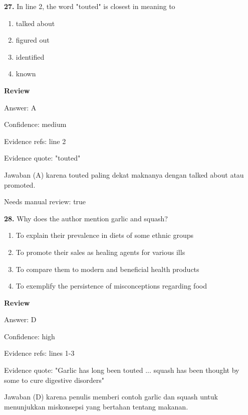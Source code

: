 \documentclass[12pt]{article}
\begin{document}
\par
\vspace{0.25\baselineskip}
\noindent\textbf{27.} In line 2, the word "touted" is closest in meaning to
\begin{enumerate}[label=(\Alph*),leftmargin=*,itemsep=0.2em]
\item talked about
\item figured out
\item identified
\item known
\end{enumerate}
\par
\begingroup
\setlength{\parskip}{0pt}
\setlength{\parindent}{0pt}
\textbf{Review}\par
Answer: A\par
Confidence: medium\par
Evidence refs: line 2\par
Evidence quote: "touted"\par
Jawaban (A) karena touted paling dekat maknanya dengan talked about atau promoted.\par
Needs manual review: true\par
\endgroup
\par
\vspace{0.25\baselineskip}
\noindent\textbf{28.} Why does the author mention garlic and squash?
\begin{enumerate}[label=(\Alph*),leftmargin=*,itemsep=0.2em]
\item To explain their prevalence in diets of some ethnic groups
\item To promote their sales as healing agents for various ills
\item To compare them to modern and beneficial health products
\item To exemplify the persistence of misconceptions regarding food
\end{enumerate}
\par
\begingroup
\setlength{\parskip}{0pt}
\setlength{\parindent}{0pt}
\textbf{Review}\par
Answer: D\par
Confidence: high\par
Evidence refs: lines 1-3\par
Evidence quote: "Garlic has long been touted ... squash has been thought by some to cure digestive disorders"\par
Jawaban (D) karena penulis memberi contoh garlic dan squash untuk menunjukkan miskonsepsi yang bertahan tentang makanan.\par
\end{document}
